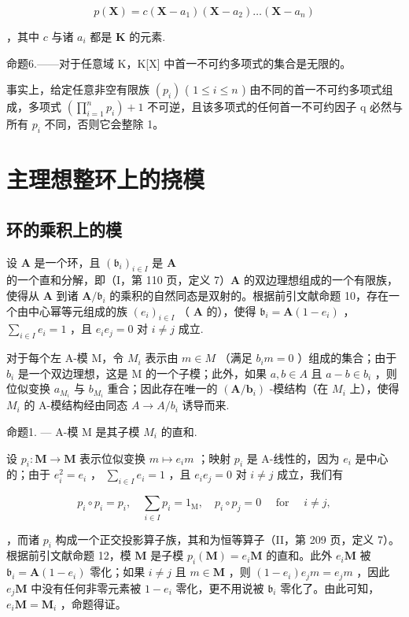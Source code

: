 \[
p (\mathbf {X}) = c \left(\mathbf {X} - a _ {1}\right) \left(\mathbf {X} - a _ {2}\right) \dots \left(\mathbf {X} - a _ {n}\right)
\]

，其中 \(c\) 与诸 \(a_{i}\) 都是 \(\mathbf{K}\) 的元素.

命题6.——对于任意域 K，K{[}X{]} 中首一不可约多项式的集合是无限的。

事实上，给定任意非空有限族 \((p_{i})\) ( \(1 \leqslant i \leqslant n\) ) 由不同的首一不可约多项式组成，多项式 \(\left(\prod_{i=1}^{n} p_{i}\right) + 1\) 不可逆，且该多项式的任何首一不可约因子 q 必然与所有 \(p_{i}\) 不同，否则它会整除 1。

\section{主理想整环上的挠模}

\subsection{环的乘积上的模}

设 \(\mathbf{A}\) 是一个环，且 \((\mathfrak{b}_i)_{i\in I}\) 是 \(\mathbf{A}\) 的一个直和分解，即（I，第 110 页，定义 7）\(\mathbf{A}\) 的双边理想组成的一个有限族，使得从 \(\mathbf{A}\) 到诸 \(\mathbf{A} / \mathfrak{b}_i\) 的乘积的自然同态是双射的。根据前引文献命题 10，存在一个由中心幂等元组成的族 \((e_i)_{i\in I}\) （ \(\mathbf{A}\) 的），使得 \(\mathfrak{b}_i = \mathbf{A}(1 - e_i)\) ， \(\sum_{i\in I}e_i = 1\) ，且 \(e_i e_j = 0\) 对 \(i\neq j\) 成立.

对于每个左 A-模 M，令 \(M_{i}\) 表示由 \(m \in M\) （满足 \(b_{i}m = 0\) ）组成的集合；由于 \(b_{i}\) 是一个双边理想，这是 M 的一个子模；此外，如果 \(a, b \in A\) 且 \(a - b \in b_{i}\) ，则位似变换 \(a_{M_{i}}\) 与 \(b_{M_{i}}\) 重合；因此存在唯一的 \((\mathbf{A}/\mathbf{b}_{i})\) -模结构（在 \(M_{i}\) 上），使得 \(M_{i}\) 的 A-模结构经由同态 \(A \to A/b_{i}\) 诱导而来.

命题1. --- A-模 M 是其子模 \(M_{i}\) 的直和.

设 \(p_i: \mathbf{M} \to \mathbf{M}\) 表示位似变换 \(m \mapsto e_i m\) ；映射 \(p_i\) 是 A-线性的，因为 \(e_i\) 是中心的；由于 \(e_i^2 = e_i\) ， \(\sum_{i \in I} e_i = 1\) ，且 \(e_i e_j = 0\) 对 \(i \neq j\) 成立，我们有

\[
p _ {i} \circ p _ {i} = p _ {i}, \quad \sum_ {i \in I} p _ {i} = 1 _ {\mathrm{M}}, \quad p _ {i} \circ p _ {j} = 0 \quad \text { for } \quad i \neq j,
\]

，而诸 \(p_i\) 构成一个正交投影算子族，其和为恒等算子（II，第 209 页，定义 7）。根据前引文献命题 12，模 \(\mathbf{M}\) 是子模 \(p_i(\mathbf{M}) = e_i\mathbf{M}\) 的直和。此外 \(e_i\mathbf{M}\) 被 \(\mathfrak{b}_i = \mathbf{A}(1 - e_i)\) 零化；如果 \(i \neq j\) 且 \(m \in \mathbf{M}\) ，则 \((1 - e_i)e_jm = e_jm\) ，因此 \(e_j\mathbf{M}\) 中没有任何非零元素被 \(1 - e_i\) 零化，更不用说被 \(\mathfrak{b}_i\) 零化了。由此可知， \(e_i\mathbf{M} = \mathbf{M}_i\) ，命题得证。

